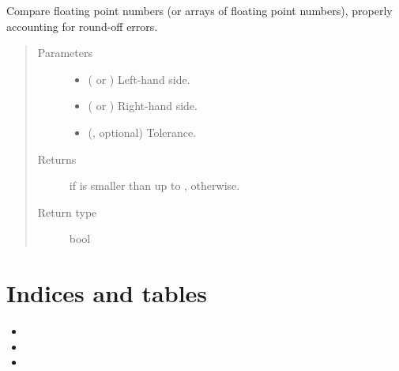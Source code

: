 \documentclass[letterpaper,10pt,english]{sphinxmanual}
\begin{document}

\begin{fulllineitems}
\label{\detokenize{api:utils.smaller_than}}
Compare floating point numbers (or arrays of floating point numbers), properly accounting for round-off errors.
\begin{quote}\begin{description}
\item[{Parameters}] \leavevmode\begin{itemize}
\item {} 
 ( or ) \textendash{} Left-hand side.

\item {} 
 ( or ) \textendash{} Right-hand side.

\item {} 
 (, optional) \textendash{} Tolerance.

\end{itemize}

\item[{Returns}] \leavevmode
{} if  is smaller than  up to ,  otherwise.

\item[{Return type}] \leavevmode
bool

\end{description}\end{quote}

\end{fulllineitems}



\chapter{Indices and tables}
\label{\detokenize{index:indices-and-tables}}\begin{itemize}
\item {} 

\item {} 

\item {} 

\end{itemize}
\end{document}
